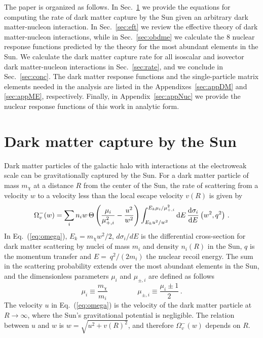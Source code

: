 \documentclass[11pt,a4paper]{article}
\begin{document}
The paper is organized as follows. In Sec.~\ref{sec:astro} we provide the equations for computing the rate of dark matter capture by the Sun given an arbitrary dark matter-nucleon interaction. In Sec.~\ref{sec:eft} we review the effective theory of dark matter-nucleon interactions, while in Sec.~\ref{sec:obdme} we calculate the 8 nuclear response functions predicted by the theory for the most abundant elements in the Sun. We calculate the dark matter capture rate for all isoscalar and isovector dark matter-nucleon interactions in Sec.~\ref{sec:rate}, and we conclude in Sec.~\ref{sec:conc}. The dark matter response functions and the single-particle matrix elements needed in the analysis are listed in the Appendixes~\ref{sec:appDM} and \ref{sec:appME}, respectively. Finally, in Appendix~\ref{sec:appNuc} we provide the nuclear response functions of this work in analytic form.


\section{Dark matter capture by the Sun}
\label{sec:astro}
Dark matter particles of the galactic halo with interactions at the electroweak scale can be gravitationally captured by the Sun. For a dark matter particle of mass $m_\chi$ at a distance $R$ from the center of the Sun, the rate of scattering from a velocity $w$ to a velocity less than the local escape velocity $v(R)$ is given by~\cite{Gould:1987ir}
\begin{equation}
\Omega_{v}^{-}(w)= \sum_i n_i w\,\Theta\left( \frac{\mu_i}{\mu^2_{+,i}} - \frac{u^2}{w^2} \right)\int_{E_k u^2/w^2}^{E_k \mu_i/\mu_{+,i}^2} {\rm d}E\,\frac{{\rm d}\sigma_{i}}{{\rm d}E}\left(w^2,q^2\right)\,.
\label{eq:omega}
\end{equation}
In Eq.~(\ref{eq:omega}), $E_k=m_\chi w^2/2$, $d\sigma_i/dE$ is the differential cross-section for dark matter scattering by nuclei of mass $m_i$ and density $n_i(R)$ in the Sun, $q$ is the momentum transfer and $E=~q^2/(2m_i)$ the nuclear recoil energy. The sum in the scattering probability extends over the most abundant elements in the Sun, and the dimensionless parameters $\mu_i$ and $\mu_{\pm,i}$  are defined as follows 
\begin{equation}
\mu_i\equiv \frac{m_\chi}{m_i}\, \qquad\qquad \mu_{\pm,i}\equiv \frac{\mu_i\pm1}{2}\,.
\end{equation}
The velocity $u$ in Eq.~(\ref{eq:omega}) is the velocity of the dark matter particle at $R\rightarrow \infty$, where the Sun's gravitational potential is negligible. The relation between $u$ and  $w$ is $w=\sqrt{u^2+v(R)^2}$, and therefore $\Omega_{v}^{-}(w)$ depends on $R$.
\end{document}
